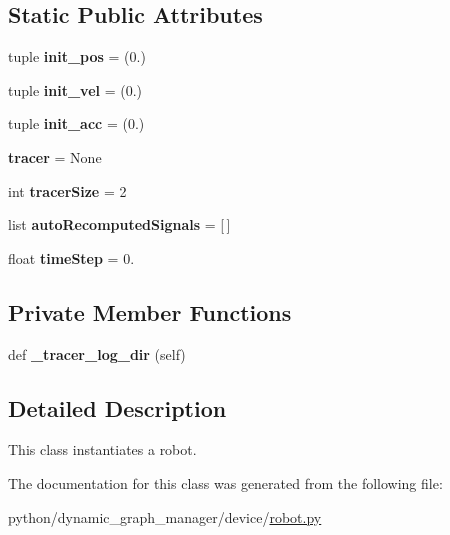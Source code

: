 \subsection*{Static Public Attributes}
\begin{DoxyCompactItemize}
\item 
tuple {\bfseries init\+\_\+pos} = (0.)\hypertarget{classrobot_1_1Robot_a72835f96d0dfcdfe1b2d4feddfa727d2}{}\label{classrobot_1_1Robot_a72835f96d0dfcdfe1b2d4feddfa727d2}

\item 
tuple {\bfseries init\+\_\+vel} = (0.)\hypertarget{classrobot_1_1Robot_ab50d0c91e1751573073a937ef9df4dad}{}\label{classrobot_1_1Robot_ab50d0c91e1751573073a937ef9df4dad}

\item 
tuple {\bfseries init\+\_\+acc} = (0.)\hypertarget{classrobot_1_1Robot_ada231c72c7967d3f61083316224fa965}{}\label{classrobot_1_1Robot_ada231c72c7967d3f61083316224fa965}

\item 
{\bfseries tracer} = None\hypertarget{classrobot_1_1Robot_adda6f00aaeb6562a2cc9d682cbcdb478}{}\label{classrobot_1_1Robot_adda6f00aaeb6562a2cc9d682cbcdb478}

\item 
int {\bfseries tracer\+Size} = 2\hypertarget{classrobot_1_1Robot_a29af80c65f6ad9e61fae2cf76d81b9e0}{}\label{classrobot_1_1Robot_a29af80c65f6ad9e61fae2cf76d81b9e0}

\item 
list {\bfseries auto\+Recomputed\+Signals} = \mbox{[}$\,$\mbox{]}\hypertarget{classrobot_1_1Robot_ab11ca34e29d7aac471df46b6fe56e7a9}{}\label{classrobot_1_1Robot_ab11ca34e29d7aac471df46b6fe56e7a9}

\item 
float {\bfseries time\+Step} = 0.\hypertarget{classrobot_1_1Robot_a4e690827b25920c0088890fbeea1667b}{}\label{classrobot_1_1Robot_a4e690827b25920c0088890fbeea1667b}

\end{DoxyCompactItemize}
\subsection*{Private Member Functions}
\begin{DoxyCompactItemize}
\item 
def {\bfseries \+\_\+tracer\+\_\+log\+\_\+dir} (self)\hypertarget{classrobot_1_1Robot_a4c9fe65c4c794832943aaa7f5ca76a09}{}\label{classrobot_1_1Robot_a4c9fe65c4c794832943aaa7f5ca76a09}

\end{DoxyCompactItemize}


\subsection{Detailed Description}
This class instantiates a robot. 

The documentation for this class was generated from the following file\+:\begin{DoxyCompactItemize}
\item 
python/dynamic\+\_\+graph\+\_\+manager/device/\hyperlink{robot_8py}{robot.\+py}\end{DoxyCompactItemize}
